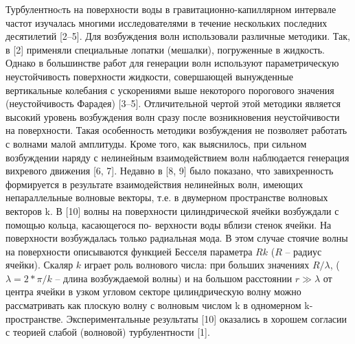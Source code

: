 Турбулентноcть на поверхности воды в гравитационно-капиллярном интервале частот изучалась многими исследователями в течение нескольких последних десятилетий [2–5]. Для возбуждения волн использовали различные методики. Так, в [2] применяли специальные лопатки (мешалки), погруженные в жидкость. Однако в большинстве работ для генерации волн используют параметрическую неустойчивость поверхности жидкости, совершающей вынужденные вертикальные колебания с ускорениями выше некоторого порогового значения (неустойчивость Фарадея) [3–5]. Отличительной чертой этой методики является высокий уровень возбуждения волн сразу после возникновения неустойчивости на поверхности. Такая особенность методики возбуждения не позволяет работать с волнами малой амплитуды. Кроме того, как выяснилось, при сильном возбуждении наряду с нелинейным взаимодействием волн наблюдается генерация вихревого движения [6, 7]. Недавно в [8, 9] было показано, что завихренность формируется в результате взаимодействия нелинейных волн, имеющих непараллельные волновые векторы, т.е. в двумерном пространстве волновых векторов k. В [10] волны на поверхности цилиндрической ячейки возбуждали с помощью кольца, касающегося по- верхности воды вблизи стенок ячейки. На поверхности возбуждалась только радиальная мода. В этом случае стоячие волны на поверхности описываются функцией Бесселя параметра $Rk$ ($R$ – радиус ячейки). Скаляр $k$ играет роль волнового числа: при больших значениях $R/\lambda$, ($\lambda = 2*\pi/k$ – длина возбуждаемой волны) и на большом расстоянии $r \gg \lambda$ от центра ячейки в узком угловом секторе цилиндрическую волну можно рассматривать как плоскую волну с волновым числом k в одномерном k-пространстве. Экспериментальные результаты [10] оказались в хорошем согласии с теорией слабой (волновой) турбулентности [1].


